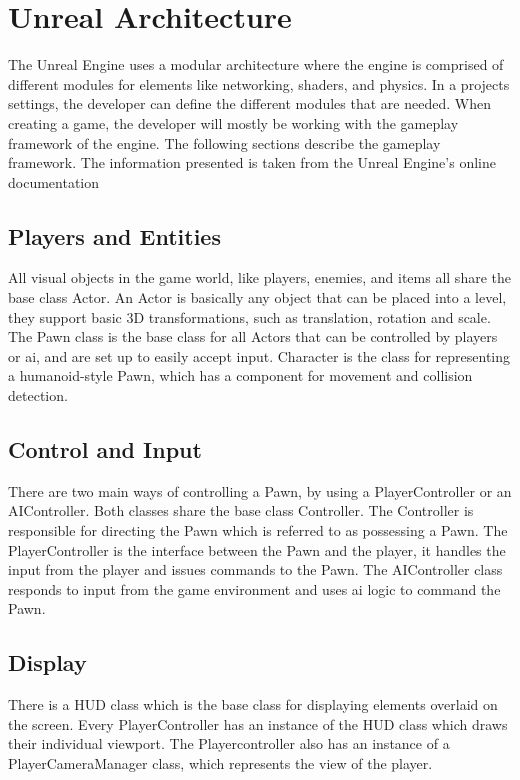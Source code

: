 \section{Unreal Architecture}
The Unreal Engine uses a modular architecture where the engine is comprised of different modules for elements like networking, shaders, and physics. In a projects settings, the developer can define the different modules that are needed. When creating a game, the developer will mostly be working with the gameplay framework of the engine. The following sections describe the gameplay framework. The information presented is taken from the Unreal Engine's online documentation \cite{epicgames2016doc}

\subsection{Players and Entities}
All visual objects in the game world, like players, enemies, and items all share the base class Actor. An Actor is basically any object that can be placed into a level, they support basic 3D transformations, such as translation, rotation and scale. The Pawn class is the base class for all Actors that can be controlled by players or \gls{ai}, and are set up to easily accept input. Character is the class for representing a humanoid-style Pawn, which has a component for movement and collision detection.

\subsection{Control and Input}
There are two main ways of controlling a Pawn, by using a PlayerController or an AIController. Both classes share the base class Controller. The Controller is responsible for directing the Pawn which is referred to as possessing a Pawn. The PlayerController is the interface between the Pawn and the player, it handles the input from the player and issues commands to the Pawn. The AIController class responds to input from the game environment and uses \gls{ai} logic to command the Pawn.

\subsection{Display}
There is a HUD class which is the base class for displaying elements overlaid on the screen. Every PlayerController has an instance of the HUD class which draws their individual viewport. The Playercontroller also has an instance of a PlayerCameraManager class, which represents the view of the player.

